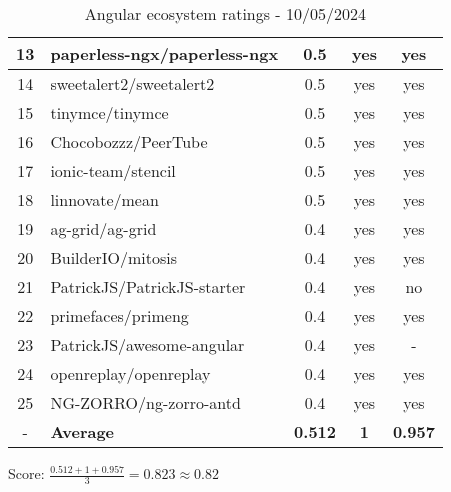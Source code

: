 \begin{table}[H]
{\begin{tabular}{|c|l|c|c|c|}
            13 & paperless-ngx/paperless-ngx & 0.5                & yes                        & yes                \\ \hline
            14 & sweetalert2/sweetalert2     & 0.5                & yes                        & yes                \\ \hline
            15 & tinymce/tinymce             & 0.5                & yes                        & yes                \\ \hline
            16 & Chocobozzz/PeerTube         & 0.5                & yes                        & yes                \\ \hline
            17 & ionic-team/stencil          & 0.5                & yes                        & yes                \\ \hline
            18 & linnovate/mean              & 0.5                & yes                        & yes                \\ \hline
            19 & ag-grid/ag-grid             & 0.4                & yes                        & yes                \\ \hline
            20 & BuilderIO/mitosis           & 0.4                & yes                        & yes                \\ \hline
            21 & PatrickJS/PatrickJS-starter & 0.4                & yes                        & no                 \\ \hline
            22 & primefaces/primeng          & 0.4                & yes                        & yes                \\ \hline
            23 & PatrickJS/awesome-angular   & 0.4                & yes                        & -                  \\ \hline
            24 & openreplay/openreplay       & 0.4                & yes                        & yes                \\ \hline
            25 & NG-ZORRO/ng-zorro-antd      & 0.4                & yes                        & yes                \\ \hline
            -  & \textbf{Average}            & \textbf{0.512}     & \textbf{1}                 & \textbf{0.957}     \\ \hline
        \end{tabular}
    }
    \caption{Angular ecosystem ratings - 10/05/2024}
    \label{tab:metrics:angular:ratings}
\end{table}

Score: $\frac{0.512 + 1 + 0.957}{3} = 0.823 \approx 0.82$

